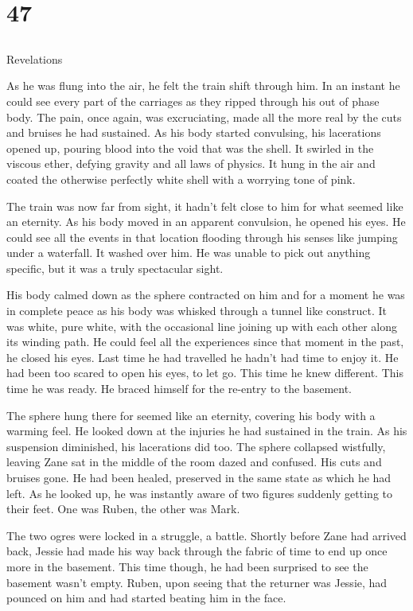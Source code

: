\chapter{47}
\section{}
Revelations  

As he was flung into the air, he felt the train shift through him.  In an instant he could see every part of the carriages as they ripped through his out of phase body.  The pain, once again, was excruciating, made all the more real by the cuts and bruises he had sustained.  As his body started convulsing, his lacerations opened up, pouring blood into the void that was the shell.  It swirled in the viscous ether, defying gravity and all laws of physics.  It hung in the air and coated the otherwise perfectly white shell with a worrying tone of pink.

The train was now far from sight, it hadn't felt close to him for what seemed like an eternity.  As his body moved in an apparent convulsion, he opened his eyes.  He could see all the events in that location flooding through his senses like jumping under a waterfall.  It washed over him.  He was unable to pick out anything specific, but it was a truly spectacular sight.

His body calmed down as the sphere contracted on him and for a moment he was in complete peace as his body was whisked through a tunnel like construct.  It was white, pure white, with the occasional line joining up with each other along its winding path.  He could feel all the experiences since that moment in the past, he closed his eyes.  Last time he had travelled he hadn't had time to enjoy it.  He had been too scared to open his eyes, to let go.  This time he knew different.  This time he was ready.  He braced himself for the re-entry to the basement.  

The sphere hung there for seemed like an eternity, covering his body with a warming feel.  He looked down at the injuries he had sustained in the train.  As his suspension diminished, his lacerations did too.  The sphere collapsed wistfully, leaving Zane sat in the middle of the room dazed and confused.  His cuts and bruises gone.  He had been healed, preserved in the same state as which he had left.  As he looked up, he was instantly aware of two figures suddenly getting to their feet.  One was Ruben, the other was Mark.  

The two ogres were locked in a struggle, a battle.  Shortly before Zane had arrived back, Jessie had made his way back through the fabric of time to end up once more in the basement.  This time though, he had been surprised to see the basement wasn't empty.  Ruben, upon seeing that the returner was Jessie, had pounced on him and had started beating him in the face.  

